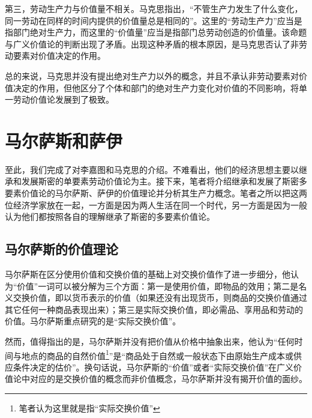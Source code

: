 第三，劳动生产力与价值量不相关。马克思指出，“不管生产力发生了什么变化，同一劳动在同样的时间内提供的价值量总是相同的”\cite[60]{ZhongGongZhongYangMaKeSiEnGeSiLieNingSiDaLinZhuZuoBianYiJuMaKeSiEnGeSiWenJiDi5Juan2009}。这里的“劳动生产力”应当是指部门绝对生产力，而这里的“价值量”应当是指部门总劳动创造的价值量\cite[274]{CaiJiMingCongGuDianZhengZhiJingJiXueDaoZhongGuoTeSeSheHuiZhuYiZhengZhiJingJiXueJiYuZhongGuoShiJiaoDeZhengZhiJingJiXueYanBianShangCe2023}。该命题与广义价值论的判断出现了矛盾。出现这种矛盾的根本原因，是马克思否认了非劳动要素对价值决定的作用\cite[274]{CaiJiMingCongGuDianZhengZhiJingJiXueDaoZhongGuoTeSeSheHuiZhuYiZhengZhiJingJiXueJiYuZhongGuoShiJiaoDeZhengZhiJingJiXueYanBianShangCe2023}。

总的来说，马克思并没有提出绝对生产力以外的概念，并且不承认非劳动要素对价值决定的作用，但他区分了个体和部门的绝对生产力变化对价值的不同影响，将单一劳动价值论发展到了极致。

\section{马尔萨斯和萨伊}

至此，我们完成了对李嘉图和马克思的介绍。不难看出，他们的经济思想主要以继承和发展斯密的单要素劳动价值论为主。接下来，笔者将介绍继承和发展了斯密多要素价值论的马尔萨斯、萨伊的价值理论并分析其生产力概念。笔者之所以把这两位经济学家放在一起，一方面是因为两人生活在同一个时代\cite[132，140]{YanZhiJieXiFangJingJiXueShuoShiJiaoChengDiErBan2013}，另一方面是因为一般认为他们都按照各自的理解继承了斯密的多要素价值论\cite[169]{CaiJiMingCongGuDianZhengZhiJingJiXueDaoZhongGuoTeSeSheHuiZhuYiZhengZhiJingJiXueJiYuZhongGuoShiJiaoDeZhengZhiJingJiXueYanBianShangCe2023}。

\subsection{马尔萨斯的价值理论}

马尔萨斯在区分使用价值和交换价值的基础上对交换价值作了进一步细分，他认为“价值”一词可以被分解为三个方面：第一是使用价值，即物品的效用；第二是名义交换价值，即以货币表示的价值（如果还没有出现货币，则商品的交换价值通过其它任何一种商品表现出来\cite[32]{BiLuo*SiLaFaDaWeiLiJiaTuQuanJiDi2JuanMaErSaSiZhengZhiJingJiXueYuanLiPingZhu2013}）；第三是实际交换价值，即必需品、享用品和劳动的价值\cite[42]{BiLuo*SiLaFaDaWeiLiJiaTuQuanJiDi2JuanMaErSaSiZhengZhiJingJiXueYuanLiPingZhu2013}。马尔萨斯重点研究的是“实际交换价值”。

然而，值得指出的是，马尔萨斯并没有把价值从价格中抽象出来，他认为“任何时间与地点的商品的自然价值\footnote{笔者认为这里就是指“实际交换价值”}”是“商品处于自然或一般状态下由原始生产成本或供应条件决定的估价”\cite[132]{MaErSaSiZhengZhiJingJiXueDingYi2023}。换句话说，马尔萨斯的“价值”或者“实际交换价值”在广义价值论中对应的是交换价值的概念而非价值概念，马尔萨斯并没有揭开价值的面纱。

